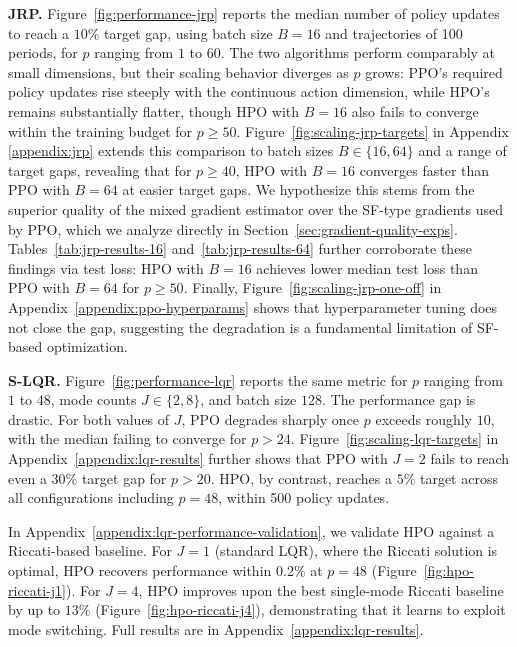 \documentclass{article}
\theoremstyle{definition}
\theoremstyle{remark}
\begin{document}
{\bf JRP.}
Figure~\ref{fig:performance-jrp} reports the median number of policy updates to reach a $10\%$
target gap, using batch size $B=16$ and trajectories of 100 periods, for $p$ ranging from $1$
to $60$. The two algorithms perform comparably at small dimensions, but their scaling behavior
diverges as $p$ grows: PPO's required policy updates rise steeply with the continuous action dimension,
while HPO's remains substantially flatter, though HPO with $B=16$ also fails to converge
within the training budget for $p \geq 50$. Figure~\ref{fig:scaling-jrp-targets} in Appendix \ref{appendix:jrp} extends this
comparison to batch sizes $B \in \{16, 64\}$ and a range of target gaps, revealing that for
$p \geq 40$, HPO with $B=16$ converges faster than PPO with $B=64$ at easier target gaps. We hypothesize this
stems from the superior quality of the mixed gradient estimator over the SF-type gradients
used by PPO, which we analyze directly in Section~\ref{sec:gradient-quality-exps}. Tables~\ref{tab:jrp-results-16}
and~\ref{tab:jrp-results-64} further corroborate these findings via test loss: HPO with $B=16$
achieves lower median test loss than PPO with $B=64$ for $p \geq 50$. Finally,
Figure~\ref{fig:scaling-jrp-one-off} in Appendix~\ref{appendix:ppo-hyperparams} shows that
hyperparameter tuning does not close the gap, suggesting the degradation is a fundamental
limitation of SF-based optimization.

{\bf S-LQR.}
Figure~\ref{fig:performance-lqr} reports the same metric for $p$ ranging from $1$ to $48$,
mode counts $J \in \{2, 8\}$, and batch size $128$. The performance gap is drastic. For 
both values of $J$, PPO degrades sharply once $p$ exceeds roughly $10$, with the median 
failing to converge for $p > 24$. Figure~\ref{fig:scaling-lqr-targets} in 
Appendix~\ref{appendix:lqr-results} further shows that PPO with $J = 2$ fails to reach 
even a $30\%$ target gap for $p>20$. HPO, by contrast, reaches a $5\%$ target across 
all configurations including $p = 48$, within 500 policy updates.
 
In Appendix~\ref{appendix:lqr-performance-validation}, we validate HPO against a 
Riccati-based baseline. For $J=1$ (standard LQR), where the Riccati solution is  optimal, HPO recovers performance within $0.2\%$ at $p=48$ 
(Figure~\ref{fig:hpo-riccati-j1}). For $J=4$, HPO improves upon the best single-mode 
Riccati baseline by up to $13\%$ (Figure~\ref{fig:hpo-riccati-j4}), demonstrating 
that it learns to exploit mode switching. Full results are in 
Appendix~\ref{appendix:lqr-results}.
 
\end{document}
